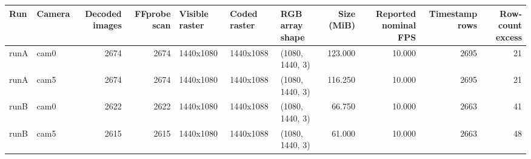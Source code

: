 \begin{tabular}{llrrlllrrrr}
\toprule
Run & Camera & Decoded images & FFprobe scan & Visible raster & Coded raster & RGB array shape & Size (MiB) & Reported nominal FPS & Timestamp rows & Row-count excess \\
\midrule
runA & cam0 & 2674 & 2674 & 1440x1080 & 1440x1088 & (1080, 1440, 3) & 123.000 & 10.000 & 2695 & 21 \\
runA & cam5 & 2674 & 2674 & 1440x1080 & 1440x1088 & (1080, 1440, 3) & 116.250 & 10.000 & 2695 & 21 \\
runB & cam0 & 2622 & 2622 & 1440x1080 & 1440x1088 & (1080, 1440, 3) & 66.750 & 10.000 & 2663 & 41 \\
runB & cam5 & 2615 & 2615 & 1440x1080 & 1440x1088 & (1080, 1440, 3) & 61.000 & 10.000 & 2663 & 48 \\
\bottomrule
\end{tabular}
